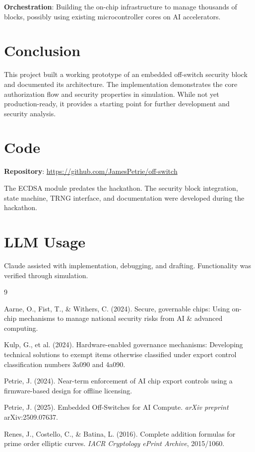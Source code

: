 \documentclass[11pt]{article}
\begin{document}
\textbf{Orchestration}: Building the on-chip infrastructure to manage thousands of blocks, possibly using existing microcontroller cores on AI accelerators.

\section{Conclusion}

This project built a working prototype of an embedded off-switch security block and documented its architecture. The implementation demonstrates the core authorization flow and security properties in simulation. While not yet production-ready, it provides a starting point for further development and security analysis.

\section*{Code}

\textbf{Repository}: \url{https://github.com/JamesPetrie/off-switch}

The ECDSA module predates the hackathon. The security block integration, state machine, TRNG interface, and documentation were developed during the hackathon.

\section*{LLM Usage}

Claude assisted with implementation, debugging, and drafting. Functionality was verified through simulation.

\begin{thebibliography}{9}

Aarne, O., Fist, T., \& Withers, C. (2024).
Secure, governable chips: Using on-chip mechanisms to manage national security risks from AI \& advanced computing.

Kulp, G., et al. (2024).
Hardware-enabled governance mechanisms: Developing technical solutions to exempt items otherwise classified under export control classification numbers 3a090 and 4a090.

Petrie, J. (2024).
Near-term enforcement of AI chip export controls using a firmware-based design for offline licensing.

Petrie, J. (2025).
Embedded Off-Switches for AI Compute.
\textit{arXiv preprint} arXiv:2509.07637.

Renes, J., Costello, C., \& Batina, L. (2016).
Complete addition formulas for prime order elliptic curves.
\textit{IACR Cryptology ePrint Archive}, 2015/1060.

\end{thebibliography}
\end{document}
